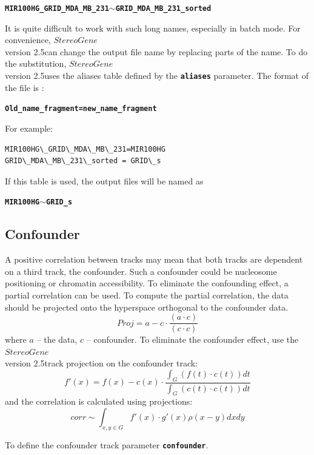 \documentclass{article}
\newcommand{\prm}[1]{\texttt{\textbf{{#1}}}}
\newcommand{\sg}{$StereoGene$\\ version 2.5}
\begin{document}
\begin{center}
\prm{MIR100HG\_GRID\_MDA\_MB\_231}$\sim$\prm{GRID\_MDA\_MB\_231\_sorted} 
\end{center}

It is quite difficult to work with such long names, especially in batch mode.
For convenience, \sg can change the output file name by replacing parts of the name. To do the substitution, \sg uses the aliases table defined by the \prm{aliases} parameter. The format of the file is :
\begin{center}
\prm{Old\_name\_fragment=new\_name\_fragment} 
\end{center}
For example:

\begin{shaded} 
\begin{verbatim}
MIR100HG\_GRID\_MDA\_MB\_231=MIR100HG
GRID\_MDA\_MB\_231\_sorted = GRID\_s
\end{verbatim}
\end{shaded}

If this table is used, the output files will be named as
\begin{center}
\prm{MIR100HG}$\sim$\prm{GRID\_s} 
\end{center}


\subsection{Confounder}\label{confoud}
A positive correlation between tracks may mean that both tracks are dependent on a third track, the confounder.
Such a confounder could be nucleosome positioning or chromatin accessibility.
To eliminate the confounding effect, a partial correlation can be used. 
To compute the partial correlation, the data should be projected onto the hyperspace orthogonal to the confounder data.
$$
Proj=a-c\cdot\frac{(a\cdot c)}{(c\cdot c)}
$$
where $a$ -- the data, $c$ -- confounder. 
To eliminate the confounder effect, use the \sg track projection on the confounder track:
$$
f'(x)=f(x)-c(x)\cdot\frac{\int_G (f(t)\cdot c(t)) dt}{\int_G (c(t)\cdot c(t)) dt}
$$
and the correlation is calculated using projections:
$$
corr\sim \int_{x,y\in G} f'(x)\cdot g'(x) \rho(x-y) dx dy 
$$

To define the confounder track parameter \prm{confounder}.

\end{document}
